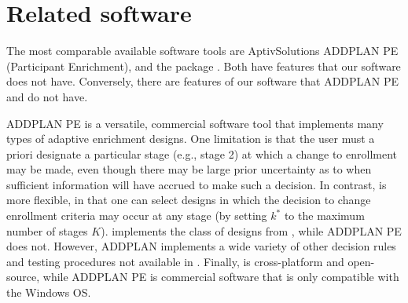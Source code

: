 \documentclass[article]{jss}
\begin{document}



\section{Related software}
\label{ADDPLAN}

The most comparable available software tools are AptivSolutions ADDPLAN PE (Participant Enrichment), and the   package \citep{parsons2012r}. Both have features that our software does not have. Conversely, there are features of our software that ADDPLAN PE and  do not have.

ADDPLAN PE is a versatile, commercial software tool that implements many types of adaptive enrichment designs. One limitation is that the user must a priori designate a particular stage (e.g., stage 2) at which a change to enrollment may be made, even though there may be large prior uncertainty as to when sufficient information will have accrued to make such a decision. In contrast,  is more flexible, in that one can select designs in which the decision to change enrollment criteria may occur at any stage (by setting $k^*$ to the maximum number of stages $K$). 
   implements the class of designs from \citep{Rosenblum2013AdaptMISTIE}, while ADDPLAN PE does not. However, ADDPLAN implements a wide variety of other decision rules and testing procedures not available in  .
Finally,   is cross-platform and open-source, while ADDPLAN PE is commercial software that is only compatible with the Windows OS.
\end{document}
